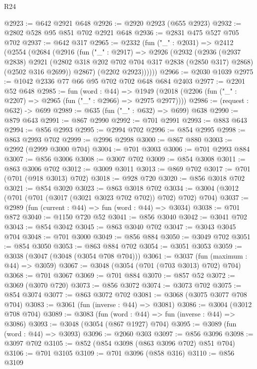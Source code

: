 \begin{lexlean}{R24}
\begin{coremodule}
@2923 := @642 @2921 @648
@2926 := @2920 @2923 (@655 @2923)
@2932 := @2802 @528 @95 @851 @702 @2921 @648
@2936 := @2831 @475 @527 @705 @702
@2937 := @642 @317
@2965 := @2332
    (fun ("_" : @2031) =>
    @2412
      (@2554
        (@2684
          (@2916
            (fun ("_" : @2917) =>
            @2926
              (@2932
                (@2936
                  (@2937 @2838)
                  @2921
                  (@2802 @318 @202 @702 @704 @317 @2838 (@2850 @317) @2868)
                  (@2502 @316 @2699))
                @2867)
              (@2202 @2923))))))
@2966 := @2030 @1039
@2975 := @1042 @2336 @77 @66 @95 @702 @702 @648 @684 @2403
@2977 := @2201 @52 @648
@2985 := fun (word : @44) =>
  @1949 (@2018 (@2206 (fun ("_" : @2207) => @2965 (fun ("_" : @2966) => @2975 @2977))))
@2986 := (request : @632) -> @699
@2989 := @635 (fun ("_" : @632) => @699) @638
@2990 := @879 @643
@2991 := @867 @2990
@2992 := @701 @2991
@2993 := @883 @643
@2994 := @856 @2993
@2995 := @2994 @702
@2996 := @854 @2995
@2998 := @863 @2993 @702
@2999 := @2996 @2998
@3000 := @867 @880
@3003 := @2992 (@2999 @3000 @704)
@3004 := @701 @3003
@3006 := @701 @2993 @884
@3007 := @856 @3006
@3008 := @3007 @702
@3009 := @854 @3008
@3011 := @863 @3006 @702
@3012 := @3009 @3011
@3013 := @869 @702
@3017 := @701 (@701 (@918 @3013) @702)
@3018 := @928 @720
@3020 := @856 @3018 @702
@3021 := @854 @3020
@3023 := @863 @3018 @702
@3034 := @3004 (@3012 (@701 (@701 (@3017 (@3021 @3023 @702 @702)) @702) @702) @704)
@3037 := @2989 (fun (current : @44) => fun (word : @44) => @3034)
@3038 := @701 @872
@3040 := @1150 @720 @52
@3041 := @856 @3040
@3042 := @3041 @702
@3043 := @854 @3042
@3045 := @863 @3040 @702
@3047 := @3043 @3045 @704
@3048 := @701 @3000
@3049 := @856 @884
@3050 := @3049 @702
@3051 := @854 @3050
@3053 := @863 @884 @702
@3054 := @3051 @3053
@3059 := @3038 (@3047 (@3048 (@3054 @708 @704)))
@3061 := @3037 (fun (maximum : @44) => @3059)
@3067 := @3048 (@3054 (@701 (@703 @3013) @702) @704)
@3068 := @701 @3067
@3069 := @701 @884
@3070 := @857 @52
@3072 := @3069 (@3070 @720)
@3073 := @856 @3072
@3074 := @3073 @702
@3075 := @854 @3074
@3077 := @863 @3072 @702
@3081 := @3068 (@3075 @3077 @708 @704)
@3083 := @3061 (fun (inverse : @44) => @3081)
@3086 := @3004 (@3012 @708 @704)
@3089 := @3083 (fun (word : @44) => fun (inverse : @44) => @3086)
@3093 := @3048 (@3054 (@867 @1927) @704)
@3095 := @3089 (fun (word : @44) => @3093)
@3096 := @2060 @303
@3097 := @856 @3096
@3098 := @3097 @702
@3105 := @852 (@854 @3098 (@863 @3096 @702) @851 @704)
@3106 := @701 @3105
@3109 := @701 @3096 (@858 @316)
@3110 := @856 @3109

\end{coremodule}
\end{lexlean}
